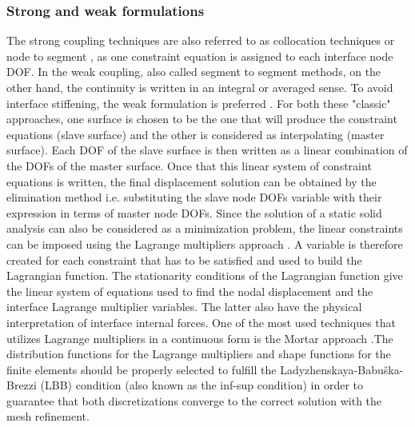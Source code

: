  \subsubsection{Strong and weak formulations}
  The strong coupling techniques are also referred to as collocation techniques \cite{rixen1997substructuring,aminpour1995coupled} or node to segment \cite{wriggers1995finite}, as one constraint equation is assigned to each interface node DOF. In the weak coupling, also called segment to segment \cite{wriggers1995finite} methods, on the other hand, the continuity is written in an integral or averaged sense. To avoid interface stiffening, the weak formulation is preferred \cite{aminpour1995coupled,fish1995iterative}. 
 For both these "classic" approaches, one surface is chosen to be the one that will produce the constraint equations (slave surface) and the other is considered as interpolating (master surface). Each DOF of the slave surface is then written as a linear combination of the DOFs of the master surface. Once that this linear system of constraint equations is written, the final displacement solution can be obtained by the elimination method \cite{barlow1982constraint} i.e. substituting the slave node DOFs variable with their expression in terms of master node DOFs. Since the solution of a static solid analysis can also be considered as a minimization problem, the linear constraints can be imposed using the Lagrange multipliers approach \cite{bertsekas2014constrained,babuvska1973finite}.  A variable is therefore created for each constraint that has to be satisfied and used to build the Lagrangian function.  The stationarity conditions of the Lagrangian function give the linear system of equations used to find the nodal displacement and the interface Lagrange multiplier variables. The latter also have the physical interpretation of interface internal forces.
 One of the most used techniques that utilizes Lagrange multipliers in a continuous form is the Mortar approach \cite{bernardi1993domain,bernardi1989new,puso20043d,puso2004mortar}.The distribution functions for the Lagrange multipliers and shape functions for
 the finite elements should be properly selected to fulfill the Ladyzhenskaya-Babu\v{s}ka-Brezzi (LBB) condition (also known as the inf-sup condition) \cite{babuvska1997babuvska} in order to guarantee that both discretizations converge to the correct solution with the mesh refinement.
